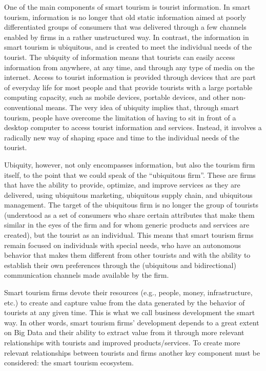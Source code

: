 \documentclass[
  letterpaper,
  DIV=11,
  numbers=noendperiod]{scrreprt}
\begin{document}
One of the main components of smart tourism is tourist information. In
smart tourism, information is no longer that old static information
aimed at poorly differentiated groups of consumers that was delivered
through a few channels enabled by firms in a rather unstructured way. In
contrast, the information in smart tourism is ubiquitous, and is created
to meet the individual needs of the tourist. The ubiquity of information
means that tourists can easily access information from anywhere, at any
time, and through any type of media on the internet. Access to tourist
information is provided through devices that are part of everyday life
for most people and that provide tourists with a large portable
computing capacity, such as mobile devices, portable devices, and other
non-conventional means. The very idea of ubiquity implies that, through
smart tourism, people have overcome the limitation of having to sit in
front of a desktop computer to access tourist information and services.
Instead, it involves a radically new way of shaping space and time to
the individual needs of the tourist.

Ubiquity, however, not only encompasses information, but also the
tourism firm itself, to the point that we could speak of the
``ubiquitous firm''. These are firms that have the ability to provide,
optimize, and improve services as they are delivered, using ubiquitous
marketing, ubiquitous supply chain, and ubiquitous management. The
target of the ubiquitous firm is no longer the group of tourists
(understood as a set of consumers who share certain attributes that make
them similar in the eyes of the firm and for whom generic products and
services are created), but the tourist as an individual. This means that
smart tourism firms remain focused on individuals with special needs,
who have an autonomous behavior that makes them different from other
tourists and with the ability to establish their own preferences through
the (ubiquitous and bidirectional) communication channels made available
by the firm.

Smart tourism firms devote their resources (e.g., people, money,
infrastructure, etc.) to create and capture value from the data
generated by the behavior of tourists at any given time. This is what we
call business development the smart way. In other words, smart tourism
firms' development depends to a great extent on Big Data and their
ability to extract value from it through more relevant relationships
with tourists and improved products/services. To create more relevant
relationships between tourists and firms another key component must be
considered: the smart tourism ecosystem.
\end{document}
